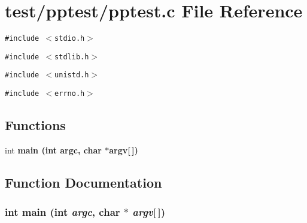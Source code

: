 \section{test/pptest/pptest.c File Reference}
\label{pptest_8c}
{\tt \#include $<$stdio.h$>$}\par
{\tt \#include $<$stdlib.h$>$}\par
{\tt \#include $<$unistd.h$>$}\par
{\tt \#include $<$errno.h$>$}\par
\subsection*{Functions}
\begin{CompactItemize}
\item 
int \bf{main} (int argc, char $\ast$argv[$\,$])
\end{CompactItemize}


\subsection{Function Documentation}
\subsubsection{\setlength{\rightskip}{0pt plus 5cm}int main (int {\em argc}, char $\ast$ {\em argv}[$\,$])}\label{pptest_8c_0ddf1224851353fc92bfbff6f499fa97}


